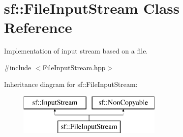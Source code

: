 \hypertarget{classsf_1_1_file_input_stream}{}\section{sf\+:\+:File\+Input\+Stream Class Reference}
\label{classsf_1_1_file_input_stream}


Implementation of input stream based on a file.  




{\ttfamily \#include $<$File\+Input\+Stream.\+hpp$>$}

Inheritance diagram for sf\+:\+:File\+Input\+Stream\+:\begin{figure}[H]
\begin{center}
\leavevmode
\includegraphics[height=2.000000cm]{classsf_1_1_file_input_stream}
\end{center}
\end{figure}
